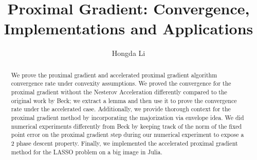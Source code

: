 \documentclass[]{article}
\title{Proximal Gradient: Convergence, Implementations and Applications}
\author{Hongda Li}
\theoremstyle{definition}
\begin{document}
\maketitle
\begin{abstract}
    We prove the proximal gradient and accelerated proximal gradient algorithm convergence rate under convexity assumptions. We proved the convergence for the proximal gradient without the Nesterov Acceleration differently compared to the original work by Beck\cite{paper:FISTA}; we extract a lemma and then use it to prove the convergence rate under the accelerated case. Additionally, we provide thorough context for the proximal gradient method by incorporating the majorization via envelope idea. We did numerical experiments differently from Beck by keeping track of the norm of the fixed point error on the proximal gradient step during our numerical experiment to expose a 2 phase descent property. Finally, we implemented the accelerated proximal gradient method for the LASSO problem on a big image in Julia.
\end{abstract}

\end{document}
